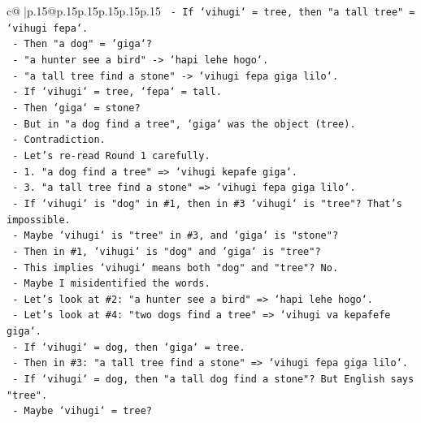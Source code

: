 \documentclass{article}
\begin{document}
{\begin{supertabular}{c@{$\;$}|p{.15\linewidth}@{}p{.15\linewidth}p{.15\linewidth}p{.15\linewidth}p{.15\linewidth}p{.15\linewidth}}
{{{\texttt{                {-}   If `vihugi` = tree, then "a tall tree" = `vihugi fepa`.} \\
\texttt{                {-}   Then "a dog" = `giga`?} \\
\texttt{                {-}   "a hunter see a bird" {-}> `hapi lehe hogo`.} \\
\texttt{                {-}   "a tall tree find a stone" {-}> `vihugi fepa giga lilo`.} \\
\texttt{                {-}   If `vihugi` = tree, `fepa` = tall.} \\
\texttt{                {-}   Then `giga` = stone?} \\
\texttt{                {-}   But in "a dog find a tree", `giga` was the object (tree).} \\
\texttt{                {-}   Contradiction.} \\
\texttt{                {-}   Let's re{-}read Round 1 carefully.} \\
\texttt{                {-}   1. "a dog find a tree" => `vihugi kepafe giga`.} \\
\texttt{                {-}   3. "a tall tree find a stone" => `vihugi fepa giga lilo`.} \\
\texttt{                {-}   If `vihugi` is "dog" in \#1, then in \#3 `vihugi` is "tree"? That's impossible.} \\
\texttt{                {-}   Maybe `vihugi` is "tree" in \#3, and `giga` is "stone"?} \\
\texttt{                {-}   Then in \#1, `vihugi` is "dog" and `giga` is "tree"?} \\
\texttt{                {-}   This implies `vihugi` means both "dog" and "tree"? No.} \\
\texttt{                {-}   Maybe I misidentified the words.} \\
\texttt{                {-}   Let's look at \#2: "a hunter see a bird" => `hapi lehe hogo`.} \\
\texttt{                {-}   Let's look at \#4: "two dogs find a tree" => `vihugi va kepafefe giga`.} \\
\texttt{                {-}   If `vihugi` = dog, then `giga` = tree.} \\
\texttt{                {-}   Then in \#3: "a tall tree find a stone" => `vihugi fepa giga lilo`.} \\
\texttt{                {-}   If `vihugi` = dog, then "a tall dog find a stone"? But English says "tree".} \\
\texttt{                {-}   Maybe `vihugi` = tree?} \\
}}}
\end{supertabular}}
\end{document}
